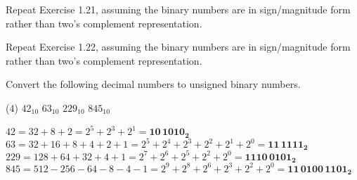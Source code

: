 \exercise %
Repeat Exercise 1.21, assuming the binary numbers are in sign/magnitude
form rather than two's complement representation.
\solution
{}

\exercise %
Repeat Exercise 1.22, assuming the binary numbers are in sign/magnitude
form rather than two's complement representation.
\solution
{}

\exercise %
Convert the following decimal numbers to unsigned
binary numbers.
\begin{tasks}(4)
	\task $42_{10}$
	\task $63_{10}$
	\task $229_{10}$
	\task $845_{10}$	
\end{tasks}
\solution
\begin{tasks}
	\task $42=32+8+2=2^5+2^3+2^1=\mathbf{10\,1010_2}$	
	\task $63=32+16+8+4+2+1=2^5+2^4+2^3+2^2+2^1+2^0=\mathbf{11\,1111_2}$
	\task $229=128+64+32+4+1=2^7+2^6+2^5+2^2+2^0=\mathbf{1110\,0101_2}$
	\task $845=512-256-64-8-4-1=2^9+2^8+2^6+2^3+2^2+2^0=\mathbf{11\,0100\,1101_2}$
\end{tasks}

